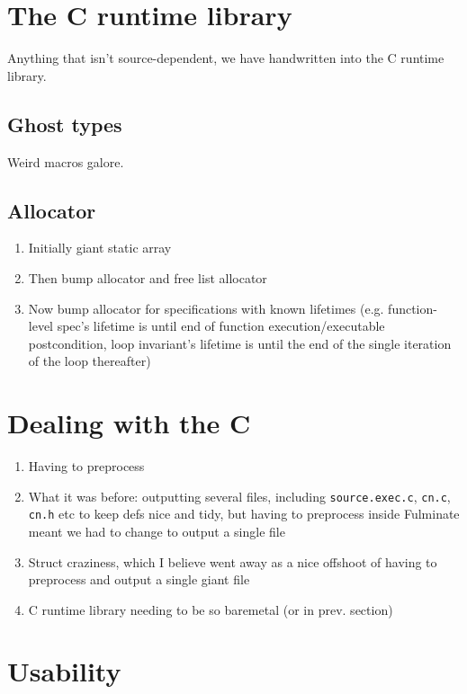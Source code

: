\documentclass[withindex,glossary]{cam-thesis}
\begin{document}
\section{The C runtime library}

Anything that isn't source-dependent, we have handwritten into the C runtime library.

\subsection{Ghost types}

Weird macros galore.

\subsection{Allocator}

\begin{enumerate}
  \item Initially giant static array
  \item Then bump allocator and free list allocator
  \item Now bump allocator for specifications with known lifetimes (e.g. function-level spec's lifetime is until end of function execution/executable postcondition, loop invariant's lifetime is until the end of the single iteration of the loop thereafter)
\end{enumerate}

\section{Dealing with the C}

\begin{enumerate}
  \item Having to preprocess
  \item What it was before: outputting several files, including \texttt{source.exec.c}, \texttt{cn.c}, \texttt{cn.h} etc to keep defs nice and tidy, but having to preprocess inside Fulminate meant we had to change to output a single file
  \item Struct craziness, which I believe went away as a nice offshoot of having to preprocess and output a single giant file
  \item C runtime library needing to be so baremetal (or in prev. section)
\end{enumerate}

\section{Usability}
\end{document}
